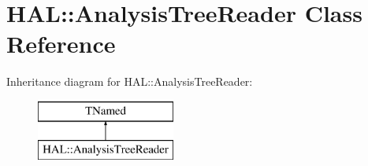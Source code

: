 \hypertarget{class_h_a_l_1_1_analysis_tree_reader}{\section{H\-A\-L\-:\-:Analysis\-Tree\-Reader Class Reference}
\label{class_h_a_l_1_1_analysis_tree_reader}
}
Inheritance diagram for H\-A\-L\-:\-:Analysis\-Tree\-Reader\-:\begin{figure}[H]
\begin{center}
\leavevmode
\includegraphics[height=2.000000cm]{class_h_a_l_1_1_analysis_tree_reader}
\end{center}
\end{figure}
